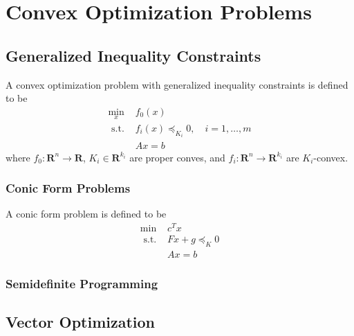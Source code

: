 \chapter{Convex Optimization Problems}

\section{Generalized Inequality Constraints}

\begin{definition}
	A convex optimization problem with generalized inequality constraints is defined to be
	\begin{equation}
		\begin{array}{ll}
			\min_x        & f_{0}(x)                                    \\
			\text{ s.t. } & f_{i}(x)\preceq_{K_{i}}0,\quad i=1,\ldots,m \\
			              & Ax=b
		\end{array}
	\end{equation}
	where $f_{0}:\mathbf{R}^n\rightarrow\mathbf{R}$, $K_i\in\mathbf{R}^{k_i}$ are proper conves, and $f_i:\mathbf{R}^n\rightarrow\mathbf{R}^{k_i}$ are $K_i$-convex.
\end{definition}

\subsection{Conic Form Problems}

\begin{definition}
	A conic form problem is defined to be
	\begin{equation}
		\begin{array}{ll}
			\min          & c^{T}x           \\
			\text{ s.t. } & Fx+g\preceq_{K}0 \\
			              & Ax=b
		\end{array}
	\end{equation}
\end{definition}

\subsection{Semidefinite Programming}

\section{Vector Optimization}
